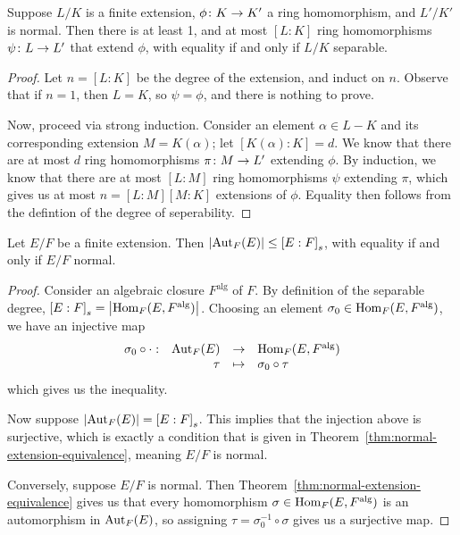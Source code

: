 \begin{proposition}
    Suppose \(L/K\) is a finite extension,
    \(\phi\colon K\to K'\) a ring homomorphism,
    and \(L'/K'\) is normal.
    Then there is at least 1, and at most \([L:K]\) ring homomorphisms
    \(\psi\colon L\to L'\) that extend \(\phi\),
    with equality if and only if \(L/K\) separable.
\end{proposition}
\begin{proof}
    Let \(n = [L:K]\) be the degree of the extension, and induct on \(n\).
    Observe that if \(n = 1\), then \(L = K\), so \(\psi = \phi\), and there is nothing to prove.

    Now, proceed via strong induction.
    Consider an element \(\alpha \in L-K\) and its corresponding extension \(M = K(\alpha)\);
    let \([K(\alpha):K] = d\).
    We know that there are at most \(d\) ring homomorphisms \(\pi\colon M\to L'\) extending \(\phi\).
    By induction, we know that there are at most \([L:M]\) ring homomorphisms \(\psi\) extending \(\pi\),
    which gives us at most \(n = [L:M][M:K]\) extensions of \(\phi\).
    Equality then follows from the defintion of the degree of seperability.
\end{proof}
\begin{proposition}\label{prop:galois-group-separable}
    Let \(E/F\) be a finite extension.
    Then \(\abs{\operatorname{Aut}_F(E)} \leq {[E:F]}_s\),
    with equality if and only if \(E/F\) normal.
\end{proposition}
\begin{proof}
    Consider an algebraic closure \(F^\text{alg}\) of \(F\).
    By definition of the separable degree, \({[E:F]}_s = \abs{\operatorname{Hom}_F(E,F^\text{alg})}\).
    Choosing an element \(\sigma_0 \in \operatorname{Hom}_F(E,F^\text{alg})\),
    we have an injective map
    \begin{equation*}
        \begin{array}{rrcl} {\sigma_0\circ\cdot}: & {\operatorname{Aut}_F(E)} &\to & {\operatorname{Hom}_F(E,F^\text{alg})} \\ & {\tau} &\mapsto & {\sigma_0\circ\tau} \end{array}
    \end{equation*}
    which gives us the inequality.

    Now suppose \(\abs{\operatorname{Aut}_F(E)} = {[E:F]}_s\).
    This implies that the injection above is surjective,
    which is exactly a condition that is given in Theorem~\ref{thm:normal-extension-equivalence},
    meaning \(E/F\) is normal.

    Conversely, suppose \(E/F\) is normal.
    Then Theorem~\ref{thm:normal-extension-equivalence} gives us that
    every homomorphism \(\sigma \in \operatorname{Hom}_F(E,F^\text{alg})\) is an automorphism in \(\operatorname{Aut}_F(E)\),
    so assigning \(\tau = \sigma_0^{-1}\circ\sigma\) gives us a surjective map.
\end{proof}


